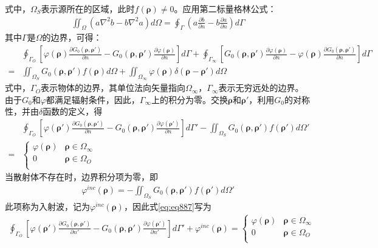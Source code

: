 \documentclass{article}
\numberwithin{equation}{section}
\renewcommand{\vec}[1]{\boldsymbol{#1}}
\begin{document}
式中，$\Omega_S$表示源所在的区域，此时$f(\vec{\rho})\neq 0$。应用第二标量格林公式：
\begin{align}
    \iint _{\Omega} (a \nabla^2 b - b \nabla^2 a)d\Omega=\oint _{\Gamma } (a\frac{\partial b}{\partial n}-b\frac{\partial a}{\partial n})d\Gamma
\end{align}
其中$\Gamma$是$\Omega$的边界，可得：
\begin{align}
    \label{eq:eq886}
     &\oint_{\Gamma_O}\left[\varphi(\vec{\rho})\frac{\partial G_0(\vec{\rho},\vec{\rho}')}{\partial n}-G_0(\vec{\rho},\vec{\rho}')\frac{\partial \varphi(\vec{\rho})}{\partial n}\right]d\Gamma+\oint_{\Gamma_{\infty}}\left[G_0(\vec{\rho},\vec{\rho}')\frac{\partial \varphi(\vec{\rho})}{\partial n}-\varphi(\vec{\rho})\frac{\partial G_0(\vec{\rho},\vec{\rho}')}{\partial n}\right]d\Gamma \nonumber \\
    =&\iint_{\Omega_S}G_0(\vec{\rho},\vec{\rho}')f(\vec{\rho})d\Omega+\iint_{\Omega_{\infty}}\varphi(\vec{\rho})\delta(\vec{\rho}-\vec{\rho}')d\Omega
\end{align}
式中，$\Gamma_O$表示物体的边界，其单位法向矢量指向$\Omega_{\infty}$，$\Gamma_{\infty}$表示无穷远处的边界。由于$G_0$和$\varphi$都满足辐射条件，因此，$\Gamma_{\infty}$上的积分为零。交换$\vec{\rho}$和$\vec{\rho}'$，利用$G_0$的对称性，并由$\delta$函数的定义，得
\begin{align}
    \label{eq:eq887}
     &\oint_{\Gamma_O}\left[\varphi(\vec{\rho}')\frac{\partial G_0(\vec{\rho},\vec{\rho}')}{\partial n}-G_0(\vec{\rho},\vec{\rho}')\frac{\partial \varphi(\vec{\rho}')}{\partial n}\right]d\Gamma'-\iint_{\Omega_S}G_0(\vec{\rho},\vec{\rho}')f(\vec{\rho}')d\Omega' \nonumber \\
    =&\left\{
        \begin{matrix}
            \varphi(\vec{\rho}) & \vec{\rho}\in\Omega_{\infty} \\
            0                   & \vec{\rho}\in\Omega_{O} \\
        \end{matrix}
    \right.
\end{align}
当散射体不存在时，边界积分项为零，即
\begin{align}
    \label{eq:eq888}
    \varphi^{inc}(\vec{\rho})=-\iint_{\Omega_S}G_0(\vec{\rho},\vec{\rho}')f(\vec{\rho}')d\Omega'
\end{align}
此项称为入射波，记为$\varphi^{inc}(\vec{\rho})$，因此式\ref{eq:eq887}写为
\begin{align}
    \label{eq:eq889}
    \oint_{\Gamma_O}\left[\varphi(\vec{\rho}')\frac{\partial G_0(\vec{\rho},\vec{\rho}')}{\partial n'}-G_0(\vec{\rho},\vec{\rho}')\frac{\partial \varphi(\vec{\rho}')}{\partial n'}\right]d\Gamma'+\varphi^{inc}(\vec{\rho})
    =\left\{
        \begin{matrix}
            \varphi(\vec{\rho}) & \vec{\rho}\in\Omega_{\infty} \\
            0                   & \vec{\rho}\in\Omega_{O} \\
        \end{matrix}
    \right.
\end{align}
\end{document}
